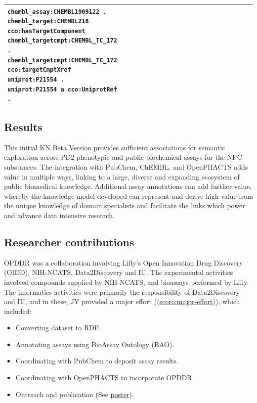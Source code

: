 \begin{singlespace}
\begin{longtable}{p{0.4\linewidth}p{0.6\linewidth}}
{\texttt{chembl\_assay:CHEMBL1909122 .}\\ \texttt{chembl\_target:CHEMBL218}\\
\texttt{cco:hasTargetComponent}\\ \texttt{chembl\_targetcmpt:CHEMBL\_TC\_172 .}\\ \texttt{chembl\_targetcmpt:CHEMBL\_TC\_172}\\ \texttt{cco:targetCmptXref}\\ \texttt{uniprot:P21554 .}\\ \texttt{uniprot:P21554 a cco:UniprotRef . }} \\
\hline
\end{longtable}
\end{singlespace}

\subsection{Results}

This initial KN Beta Version provides sufficient associations for semantic exploration across PD2 phenotypic and public biochemical assays for the NPC substances.  The integration with PubChem, ChEMBL, and OpenPHACTS adds value in multiple ways, linking to a large, diverse and expanding ecosystem of public biomedical knowledge.  Additional assay annotations can add further value, whereby the knowledge model developed can represent and derive high value from the unique knowledge of domain specialists and facilitate the links which power and advance data intensive research.

\subsection{Researcher contributions}

OPDDR was a collaboration involving Lilly's Open Innovation Drug Discovery (OIDD), NIH-NCATS, Data2Discovery and IU. The experimental activities involved compounds supplied by NIH-NCATS, and bioassays performed by Lilly. The informatics activities were primarily the responsibility of Data2Discovery and IU, and in these, JY provided a major effort ((\href{http://purl.org/spar/scoro/major-effort}{scoro:major-effort})), which included: 

\begin{itemize}[topsep=0pt,itemsep=0pt,partopsep=0pt,parsep=0pt]
    \item Converting dataset to RDF.
    \item Annotating assays using BioAssay Ontology (BAO).
    \item Coordinating with PubChem to deposit assay results.
    \item Coordinating with OpenPHACTS to incorporate OPDDR.
    \item Outreach and publication (See \href{https://zenodo.org/record/4844529}{poster}).
\end{itemize}

